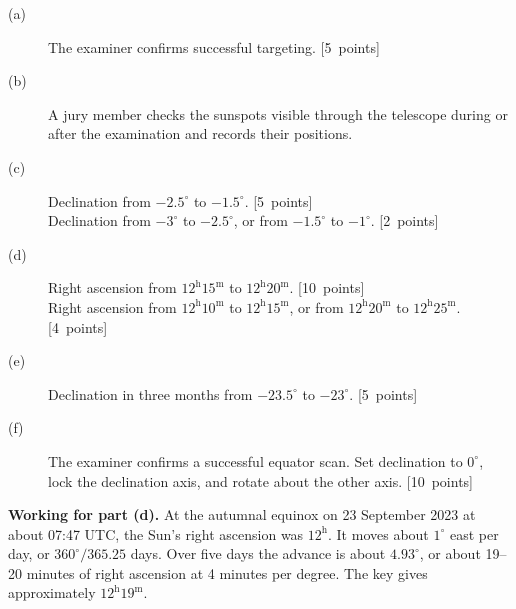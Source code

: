 \begin{description}
\item[(a)] The examiner confirms successful targeting. \hfill\mbox{[5 points]}
\item[(b)] A jury member checks the sunspots visible through the telescope during or
after the examination and records their positions.
\item[(c)] Declination from \(-2.5^\circ\) to \(-1.5^\circ\). \hfill\mbox{[5 points]}\\
Declination from \(-3^\circ\) to \(-2.5^\circ\), or from \(-1.5^\circ\) to
\(-1^\circ\). \hfill\mbox{[2 points]}
\item[(d)] Right ascension from \(12^{\mathrm h}15^{\mathrm m}\) to
\(12^{\mathrm h}20^{\mathrm m}\). \hfill\mbox{[10 points]}\\
Right ascension from \(12^{\mathrm h}10^{\mathrm m}\) to
\(12^{\mathrm h}15^{\mathrm m}\), or from \(12^{\mathrm h}20^{\mathrm m}\) to
\(12^{\mathrm h}25^{\mathrm m}\). \hfill\mbox{[4 points]}
\item[(e)] Declination in three months from \(-23.5^\circ\) to \(-23^\circ\).
\hfill\mbox{[5 points]}
\item[(f)] The examiner confirms a successful equator scan. Set declination to
\(0^\circ\), lock the declination axis, and rotate about the other axis.
\hfill\mbox{[10 points]}
\end{description}

\textbf{Working for part (d).} At the autumnal equinox on 23 September 2023
at about 07:47 UTC, the Sun's right ascension was \(12^{\mathrm h}\).
It moves about \(1^\circ\) east per day, or \(360^\circ/365.25\) days.
Over five days the advance is about \(4.93^\circ\), or about 19--20 minutes of
right ascension at 4 minutes per degree. The key gives approximately
\(12^{\mathrm h}19^{\mathrm m}\).
